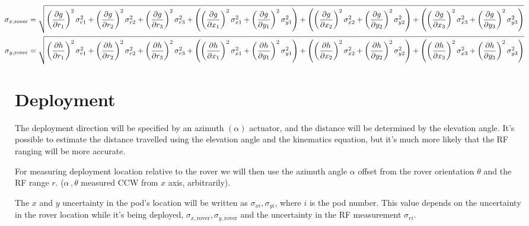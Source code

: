 \documentclass[10pt,letterpaper]{article}
\begin{document}
\begin{align*}
    \hspace{-.5cm}\sigma_{x, \text{rover}} &= \sqrt{\left( \frac{\partial g}{\partial r_1} \right)^2 \sigma_{r1} ^ 2 + \left( \frac{\partial g}{\partial r_2} \right)^2 \sigma_{r2} ^ 2 + \left( \frac{\partial g}{\partial r_3} \right) ^2 \sigma_{r3} ^ 2 +  \left( \left( \frac{\partial g}{\partial x_1} \right) ^2 \sigma_{x1} ^ 2 + \left( \frac{\partial g}{\partial y_1} \right) ^2 \sigma_{y1} ^ 2 \right) + \left( \left( \frac{\partial g}{\partial x_2} \right) ^2 \sigma_{x2} ^ 2 + \left( \frac{\partial g}{\partial y_2} \right) ^2 \sigma_{y2} ^ 2 \right) + \left( \left( \frac{\partial g}{\partial x_3} \right) ^2 \sigma_{x3} ^ 2 + \left( \frac{\partial g}{\partial y_3} \right) ^2 \sigma_{y3} ^ 2 \right)} \\
    \hspace{-.5cm}\sigma_{y, \text{rover}} &= \sqrt{\left( \frac{\partial h}{\partial r_1} \right)^2 \sigma_{r1} ^ 2 + \left( \frac{\partial h}{\partial r_2} \right)^2 \sigma_{r2} ^ 2 + \left( \frac{\partial h}{\partial r_3} \right) ^2 \sigma_{r3} ^ 2 +  \left( \left( \frac{\partial h}{\partial x_1} \right) ^2 \sigma_{x1} ^ 2 + \left( \frac{\partial h}{\partial y_1} \right) ^2 \sigma_{y1} ^ 2 \right) + \left( \left( \frac{\partial h}{\partial x_2} \right) ^2 \sigma_{x2} ^ 2 + \left( \frac{\partial h}{\partial y_2} \right) ^2 \sigma_{y2} ^ 2 \right) + \left( \left( \frac{\partial h}{\partial x_3} \right) ^2 \sigma_{x3} ^ 2 + \left( \frac{\partial h}{\partial y_3} \right) ^2 \sigma_{y3} ^ 2 \right)}
\end{align*}


\newpage 
\section{Deployment}

The deployment direction will be specified by an azimuth $(\alpha)$ actuator, and the distance will be determined by the elevation angle. It's possible to estimate the distance travelled using the elevation angle and the kinematics equation, but it's much more likely that the RF ranging will be more accurate. 

For measuring deployment location relative to the rover we will then use the azimuth angle $\alpha$ offset from the rover orientation $\theta$ and the RF range $r$. ($\alpha \, , \theta$ measured CCW from $x$ axis, arbitrarily).

The $x$ and $y$ uncertainty in the pod's location will be written as $\sigma_{xi}, \sigma_{yi}$, where $i$ is the pod number. This value depends on the uncertainty in the rover location while it's being deployed, $\sigma_{x, \text{rover}}, \sigma_{y, \text{rover}}$ and the uncertainty in the RF measurement $\sigma_{ri}$.
\end{document}
